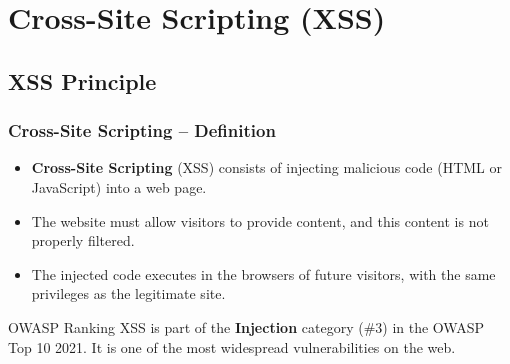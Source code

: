 \documentclass{beamer}
\def\emptyline{\vspace{10pt}}
\begin{document}
\section{Cross-Site Scripting (XSS)}


\subsection{XSS Principle}

\begin{frame}
\frametitle{Cross-Site Scripting -- Definition}

\begin{itemize}
\item \textbf{Cross-Site Scripting} (XSS) consists of injecting malicious code (HTML or JavaScript) into a web page.
\item The website must allow visitors to provide content, and this content is \alert{not properly filtered}.
\item The injected code executes in the browsers of future visitors, with the \alert{same privileges} as the legitimate site.
\end{itemize}

\emptyline
\begin{block}{OWASP Ranking}
XSS is part of the \textbf{Injection} category (\#3) in the OWASP Top 10 2021. It is one of the most widespread vulnerabilities on the web.
\end{block}
\end{frame}
\end{document}
